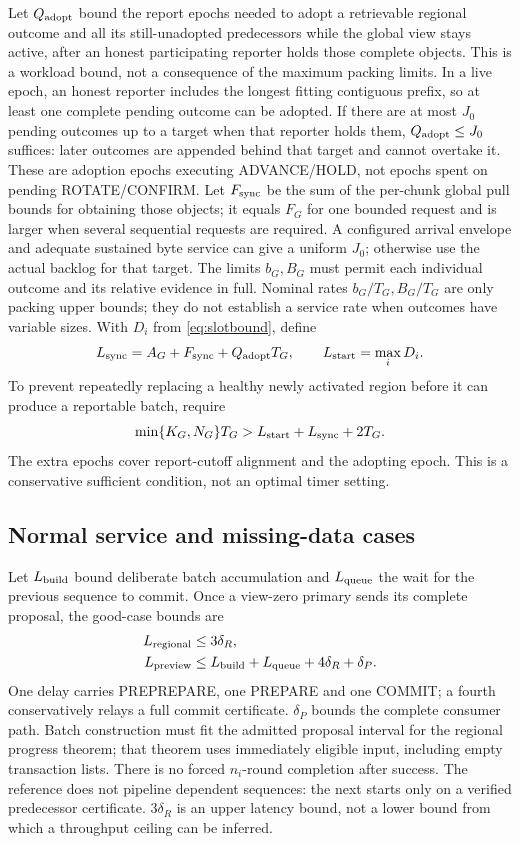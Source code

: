 \documentclass[11pt,a4paper,onecolumn]{article}
\theoremstyle{remark}\newtheorem{example}[definition]{Example}
\begin{document}
Let $Q_{\rm adopt}$ bound the report epochs needed to adopt a retrievable regional outcome
and all its still-unadopted predecessors while the global view stays active,
after an honest participating reporter holds those complete objects.
This is a workload bound, not a consequence of the maximum packing limits.
In a live epoch, an honest reporter includes the longest fitting contiguous
prefix, so at least one complete pending outcome can be adopted. If there are
at most $J_0$ pending outcomes up to a target when that reporter holds them,
$Q_{\rm adopt}\leq J_0$ suffices: later outcomes are appended behind that target and cannot
overtake it. These are adoption epochs executing ADVANCE/HOLD, not epochs
spent on pending ROTATE/CONFIRM. Let $F_{\rm sync}$ be the sum of the per-chunk
global pull bounds for obtaining those objects; it equals $F_G$ for one bounded
request and is larger when several sequential requests are required.
A configured arrival envelope and adequate sustained byte service
can give a uniform $J_0$; otherwise use the actual backlog for that target.
The limits $b_G,B_G$ must permit each individual outcome and its relative
evidence in full. Nominal rates $b_G/T_G,B_G/T_G$ are only packing upper bounds;
they do not establish a service rate when outcomes have variable sizes.
With $D_i$ from \eqref{eq:slotbound}, define
\[
 L_{\rm sync}=A_G+F_{\rm sync}+Q_{\rm adopt}T_G,\qquad
 L_{\rm start}=\max_i D_i.
\]
To prevent repeatedly replacing a healthy newly activated region before it can
produce a reportable batch, require
\begin{equation}\label{eq:tenure}
 \min\{K_G,N_G\}T_G>L_{\rm start}+L_{\rm sync}+2T_G.
\end{equation}
The extra epochs cover report-cutoff alignment and the adopting epoch. This is
a conservative sufficient condition, not an optimal timer setting.

\subsection{Normal service and missing-data cases}

Let $L_{\rm build}$ bound deliberate batch accumulation and $L_{\rm queue}$
the wait for the previous sequence to commit. Once a view-zero primary sends
its complete proposal, the good-case bounds are
\begin{align}
 L_{\rm regional}&\leq3\delta_R,\label{eq:fast}\\
 L_{\rm preview}&\leq L_{\rm build}+L_{\rm queue}+4\delta_R+\delta_P.
 \label{eq:preview}
\end{align}
One delay carries PREPREPARE, one PREPARE and one COMMIT; a fourth conservatively
relays a full commit certificate. $\delta_P$ bounds the complete consumer path.
Batch construction must fit the admitted proposal interval for the regional
progress theorem; that theorem uses immediately eligible input, including empty
transaction lists. There is no forced $n_i$-round completion after success.
The reference does not pipeline dependent sequences: the next starts only on
a verified predecessor certificate. $3\delta_R$ is an upper latency bound, not
a lower bound from which a throughput ceiling can be inferred.
\end{document}
